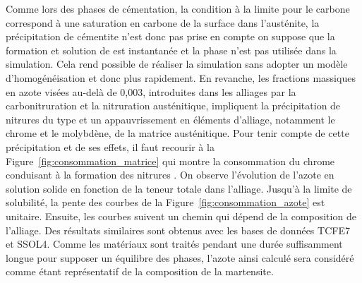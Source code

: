 Comme lors des phases de cémentation, la condition à la limite pour le carbone correspond à une saturation en carbone de la surface dans l'austénite, la précipitation de cémentite n'est donc pas prise en compte \textemdash{} on suppose que la formation et solution de  est instantanée et la phase n'est pas utilisée dans la simulation. Cela rend possible de réaliser la simulation sans adopter un modèle d'homogénéisation et donc plus rapidement. En revanche, les fractions massiques en azote visées au-delà de 0,003, introduites dans les alliages par la carbonitruration et la nitruration austénitique, impliquent la précipitation de nitrures du type  et un appauvrissement en éléments d'alliage, notamment le chrome et le molybdène, de la matrice austénitique.  Pour tenir compte de cette précipitation et de ses effets, il faut recourir à la Figure~\ref{fig:consommation_matrice} qui montre la consommation du chrome conduisant à la formation des nitrures . On observe l'évolution de l'azote en solution solide en fonction de la teneur totale dans l'alliage. Jusqu'à la limite de solubilité, la pente des courbes de la Figure~\ref{fig:consommation_azote} est unitaire. Ensuite, les courbes suivent un chemin qui dépend de la composition de l'alliage. Des résultats similaires sont obtenus avec les bases de données TCFE7 et SSOL4. Comme les matériaux sont traités pendant une durée suffisamment longue pour supposer un équilibre des phases, l'azote ainsi calculé sera considéré comme étant représentatif de la composition de la martensite.%

